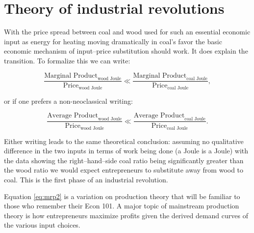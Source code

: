 	\section{Theory of industrial revolutions}	
	With the price spread between coal and wood used for such an essential economic input as energy for heating moving dramatically in coal's favor the basic economic mechanism of input--price substitution should work. It does explain the transition. To formalize this we can write:

\linespread{1.2}
		\begin{equation}
		\label{eq:mrp1}
		\frac{\text{Marginal Product}_{\text{wood Joule}}}{\text{Price}_{\text{wood Joule}}} \ll \frac{\text{Marginal Product}_{\text{coal Joule}}}{\text{Price}_{\text{coal Joule}}},
		\end{equation}

or if one prefers a non-neoclassical writing:

		\begin{equation}
		\label{eq:mrp1}
		\frac{\text{Average Product}_{\text{wood Joule}}}{\text{Price}_{\text{wood Joule}}} \ll \frac{\text{Average Product}_{\text{coal Joule}}}{\text{Price}_{\text{coal Joule}}}.
		\end{equation}
\linespread{1.9}

Either writing leads to the same theoretical conclusion: assuming no qualitative difference in the two inputs in terms of work being done (a Joule is a Joule) with the data showing the right--hand--side coal ratio being significantly greater than the wood ratio we would expect entrepreneurs to substitute away from wood to coal. This is the first phase of an industrial revolution.

Equation \ref{eq:mrp2} is a variation on production theory that will be familiar to those who remember their Econ 101. A major topic of mainstream production theory is how entrepreneurs maximize profits given the derived demand curves of the various input choices. 


